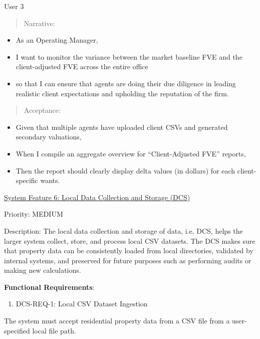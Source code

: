 User 3

\begin{quote}
Narrative:
\end{quote}

\begin{itemize}
\item
  As an Operating Manager,
\item
  I want to monitor the variance between the market baseline FVE and the
  client-adjusted FVE across the entire office
\item
  so that I can ensure that agents are doing their due diligence in
  leading realistic client expectations and upholding the reputation of
  the firm.
\end{itemize}

\begin{quote}
Acceptance:
\end{quote}

\begin{itemize}
\item
  Given that multiple agents have uploaded client CSVs and generated
  secondary valuations,
\item
  When I compile an aggregate overview for ``Client-Adjusted FVE''
  reports,
\item
  Then the report should clearly display delta values (in dollars) for
  each client-specific wants.
\end{itemize}

\ul{System Feature 6: Local Data Collection and Storage (DCS)}

Priority: MEDIUM

Description: The local data collection and storage of data, i.e. DCS,
helps the larger system collect, store, and process local CSV datasets.
The DCS makes sure that property data can be consistently loaded from
local directories, validated by internal systems, and preserved for
future purposes such as performing audits or making new calculations.

\textbf{Functional Requirements}:

\begin{enumerate}
\def\labelenumi{\Roman{enumi})}
\setcounter{enumi}{2}
\item
  DCS-REQ-1: Local CSV Dataset Ingestion
\end{enumerate}

The system must accept residential property data from a CSV file from a
user-specified local file path.

